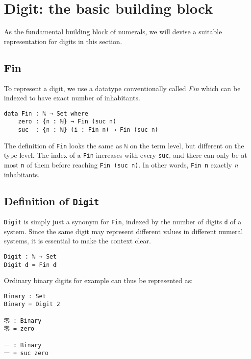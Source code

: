 \documentclass[\main/thesis.tex]{subfiles}
\begin{document}
\section{Digit: the basic building block}\label{digit}

As the fundamental building block of numerals, we will devise a suitable
representation for digits in this section.

\subsection{Fin}

To represent a digit, we use a datatype conventionally called \textit{Fin}
which can be indexed to have  exact number of inhabitants.

\begin{lstlisting}
data Fin : ℕ → Set where
    zero : {n : ℕ} → Fin (suc n)
    suc  : {n : ℕ} (i : Fin n) → Fin (suc n)
\end{lstlisting}

The definition of {\lstinline|Fin|} looks the same as {\lstinline|ℕ|} on the term
level, but different on the type level. The index of a {\lstinline|Fin|} increases
with every {\lstinline|suc|}, and there can only be at most {\lstinline|n|} of
them before reaching {\lstinline|Fin (suc n)|}. In other words, {\lstinline|Fin n|}
 exactly \textit{n} inhabitants.

\subsection{Definition of \lstinline|Digit|}

{\lstinline|Digit|} is simply just a synonym for {\lstinline|Fin|}, indexed by
the number of digits {\lstinline|d|} of a system.
Since the same digit may represent different values in different numeral systems,
it is essential to make the context clear.

\begin{lstlisting}
Digit : ℕ → Set
Digit d = Fin d
\end{lstlisting}

Ordinary binary digits for example can thus be represented as:

\begin{lstlisting}
Binary : Set
Binary = Digit 2

零 : Binary
零 = zero

一 : Binary
一 = suc zero
\end{lstlisting}
\end{document}
